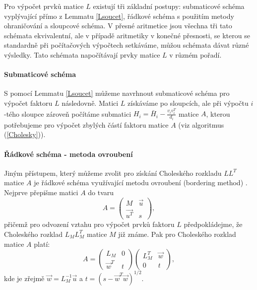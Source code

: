 \documentclass{ctuthesis}
\theoremstyle{plain}
\theoremstyle{definition}
\begin{document}
Pro výpočet prvků matice $L$ existují tři základní postupy: submaticové schéma vyplývající přímo z Lemmatu \ref{Lsoucet}, řádkové schéma s použitím metody ohraničování a sloupcové schéma. V přesné aritmetice jsou všechna tři tato schémata ekvivalentní, ale v případě aritmetiky v konečné přesnosti, se kterou se standardně při počítačových výpočtech setkáváme, můžou schémata dávat různé výsledky. Tato schémata napočítávají prvky matice $L$ v různém pořadí.

\paragraph{Submaticové schéma}
S pomocí Lemmatu \ref{Lsoucet} můžeme navrhnout submaticové schéma pro výpočet faktoru $L$ následovně. Matici $L$ získáváme po sloupcích, ale při výpočtu $i$-tého sloupce zároveň počítáme submatici $H_i = \bar{H}_i-\frac{v_i v_i^T}{d_i}$ matice $A$, kterou potřebujeme pro výpočet zbylých částí faktoru matice $A$ (viz algoritmus (\ref{Cholesky})).

\paragraph{Řádkové schéma - metoda ovroubení}
Jiným přístupem, který můžeme zvolit pro získání Choleského rozkladu $L L^T$ matice $A$ je řádkové schéma využívající metodu ovroubení (bordering method) \cite{fad:59, ort:88}. Nejprve přepišme matici $A$ do tvaru
\[
A =
\begin{pmatrix}
  M & \vec{u} \\
  \vec{u^T} & s
\end{pmatrix},
\]
přičemž pro odvození vztahu pro výpočet prvků faktoru $L$ předpokládejme, že Choleského rozklad $L_M L_M^T$ matice $M$ již známe. Pak pro Choleského rozklad matice $A$ platí:
\[
A =
\begin{pmatrix}
  L_M & 0 \\
  \vec{w}^T & t
\end{pmatrix}
\begin{pmatrix}
  L_M^T & \vec{w} \\
  0 & t
\end{pmatrix},
\]
kde je zřejmě $\vec{w}=L_M^{-1}\vec{u}$ a $t=(s-\vec{w}^T\vec{w})^{1/2}$.
\end{document}
